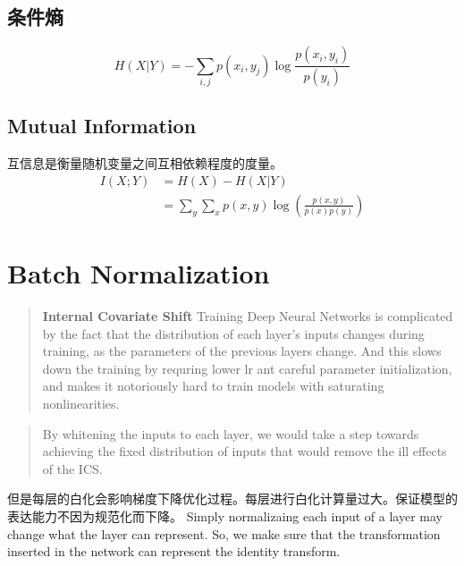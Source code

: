 \subsection{条件熵}
\begin{equation}
    H(X|Y) = -\sum_{i,j}p(x_i, y_j)\log \frac{p(x_i, y_i)}{p(y_i)}
\end{equation}

\subsection{Mutual Information}
互信息是衡量随机变量之间互相依赖程度的度量。
\begin{equation}
    \begin{split}
        I(X;Y) &= H(X) - H(X|Y) \\
        &=\sum_y\sum_x p(x, y)\log(\frac{p(x, y)}{p(x)p(y)})
    \end{split}
\end{equation}

\section{Batch Normalization}
\begin{quotation}
    \textbf{Internal Covariate Shift} Training Deep Neural Networks is complicated by the fact that the distribution of each layer's inputs
changes during training, as the parameters of the previous layers change. And this slows down the training 
by requring lower lr ant careful parameter initialization, and makes it notoriously hard to train models
with saturating nonlinearities.
\end{quotation}
\begin{quotation}
    By whitening the inputs to each layer, we would take a step towards achieving the fixed distribution
    of inputs that would remove the ill effects of the ICS.
\end{quotation}
但是每层的白化会影响梯度下降优化过程。每层进行白化计算量过大。保证模型的表达能力不因为规范化而下降。
Simply normalizaing each input of a layer may change what the layer can represent. So, we make sure that
the transformation inserted in the network can represent the identity transform.